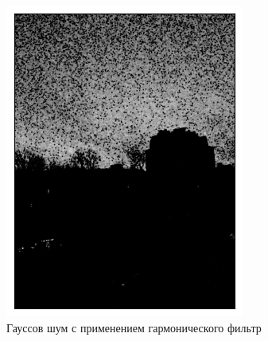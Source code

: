 \documentclass[a4paper,12pt]{article}
\begin{document}
\begin{figure}[H]
    \begin{minipage}{0.49\textwidth}
        \centering \includegraphics[width=\textwidth]{results/lpf_gaus_3.png}
        \caption{Гауссов шум с применением гармонического фильтр}
    \end{minipage}\hfill
    \begin{minipage}{0.49\textwidth}

\end{minipage}
\end{figure}
\end{document}
